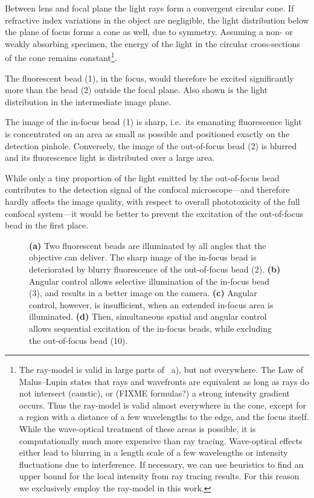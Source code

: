 Between lens and focal plane the light rays form a convergent circular
cone. If refractive index variations in the object are negligible, the
light distribution below the plane of focus forms a cone as well, due
to symmetry.  Assuming a non- or weakly absorbing specimen, the energy
of the light in the circular cross-sections of the cone remains
constant\footnote{The ray-model is valid in large parts of
~a), but not everywhere. The Law of
Malus--Lupin states that rays and wavefronts are equivalent as long as
rays do not intersect (caustic), or (FIXME formulas?) a strong
intensity gradient occurs. Thus the ray-model is valid almost
everywhere in the cone, except for a region with a distance of a few
wavelengths to the edge, and the focus itself. While the wave-optical
treatment of these areas is possible, it is computationally much more
expensive than ray tracing. Wave-optical effects either lead to
blurring in a length scale of a few wavelengths or intensity
fluctuations due to interference. If necessary, we can use heuristics
to find an upper bound for the local intensity from ray tracing
results. For this reason we exclusively employ the ray-model in this
work.}\label{sec:ray-valid}.


The fluorescent bead (1), in the focus, would therefore be excited
significantly more than the bead (2) outside the focal plane. Also
shown is the light distribution in the intermediate image plane.

The image of the in-focus bead (1) is sharp, i.e.\ its emanating  %
fluorescence light is concentrated on an area as small as possible and
positioned exactly on the detection pinhole. Conversely, the image of
the out-of-focus bead (2) is blurred and its fluorescence light is
distributed over a large area.

While only a tiny proportion of the light emitted by the out-of-focus
bead contributes to the detection signal of the confocal
microscope---and therefore hardly affects the image quality, with
respect to overall phototoxicity of the full confocal system---it
would be better to prevent the excitation of the out-of-focus bead in
the first place.

\begin{figure}[!hbt] \centering {}
  \caption{{\bf (a)} Two fluorescent beads are illuminated by all
angles that the objective can 
deliver. The sharp image of the in-focus bead is deteriorated by
blurry fluorescence of the out-of-focus bead (2). {\bf (b)} Angular
control allows selective illumination of the in-focus bead (3), and
results in a better image on the camera. {\bf (c)} Angular control,
however, is insufficient, when an extended in-focus area is
illuminated. {\bf (d)} Then, simultaneous spatial and angular control
allows sequential excitation of the in-focus beads, while excluding
the out-of-focus bead (10).}
  \label{fig:hourglass-all}
\end{figure}

